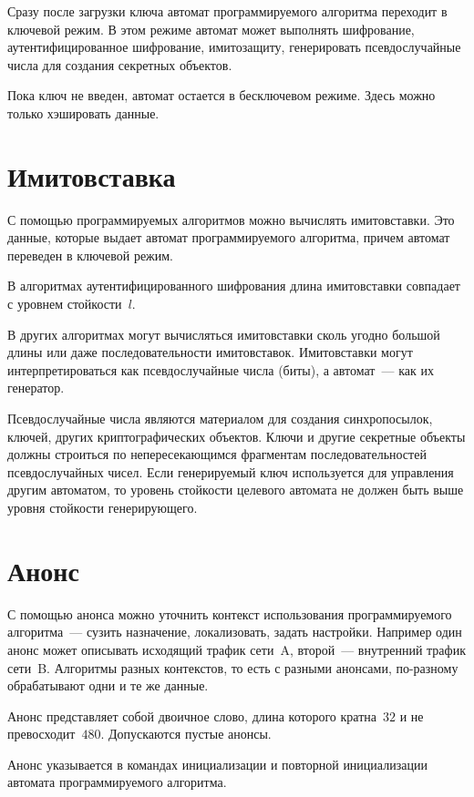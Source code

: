 Сразу после загрузки ключа автомат программируемого алгоритма 
переходит в ключевой режим. В этом режиме автомат может выполнять шифрование, 
аутентифицированное шифрование, имитозащиту, генерировать 
псевдослучайные числа для создания секретных объектов.

Пока ключ не введен, автомат остается в бесключевом режиме. Здесь можно только 
хэшировать данные. 

\section{Имитовставка}\label{COMMON.MAC}

С помощью программируемых алгоритмов можно вычислять имитовставки.
Это данные, которые выдает автомат программируемого 
алгоритма, причем автомат переведен в ключевой режим.

В алгоритмах аутентифицированного шифрования длина имитовставки 
совпадает с уровнем стойкости~$l$. 

В других алгоритмах могут вычисляться имитовставки сколь угодно 
большой длины или даже последовательности имитовставок. Имитовставки могут 
интерпретироваться как псевдослучайные числа (биты), а автомат~--- как их 
генератор. 

Псевдослучайные числа являются материалом для создания синхропосылок,
ключей, других криптографических объектов. 
%
Ключи и другие секретные объекты должны строиться по непересекающимся 
фрагментам последовательностей псевдослучайных чисел.
%
Если генерируемый ключ используется для управления другим автоматом, 
то уровень стойкости целевого автомата не должен быть выше уровня стойкости 
генерирующего.

\section{Анонс}\label{COMMON.Anounce}

С помощью анонса можно уточнить контекст использования программируемого 
алгоритма~--- сузить назначение, локализовать, задать настройки.
%
Например один анонс может описывать исходящий трафик сети~A, 
второй~--- внутренний трафик сети~B.
%
Алгоритмы разных контекстов, то есть с разными анонсами, 
по-разному обрабатывают одни и те же данные. 

Анонс представляет собой двоичное слово, длина которого кратна~$32$ и не 
превосходит~$480$. Допускаются пустые анонсы.

Анонс указывается в командах инициализации и повторной инициализации
автомата программируемого алгоритма. 

